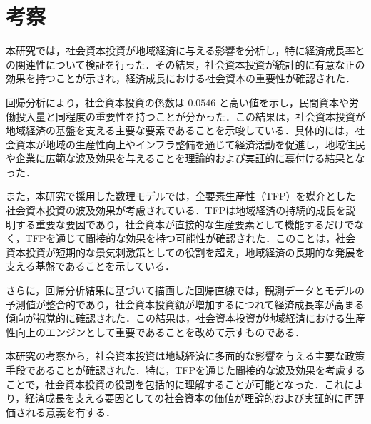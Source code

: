 \section{考察}

本研究では，社会資本投資が地域経済に与える影響を分析し，特に経済成長率との関連性について検証を行った．その結果，社会資本投資が統計的に有意な正の効果を持つことが示され，経済成長における社会資本の重要性が確認された．

回帰分析により，社会資本投資の係数は \( 0.0546 \) と高い値を示し，民間資本や労働投入量と同程度の重要性を持つことが分かった．この結果は，社会資本投資が地域経済の基盤を支える主要な要素であることを示唆している．具体的には，社会資本が地域の生産性向上やインフラ整備を通じて経済活動を促進し，地域住民や企業に広範な波及効果を与えることを理論的および実証的に裏付ける結果となった．

また，本研究で採用した数理モデルでは，全要素生産性（TFP）を媒介とした社会資本投資の波及効果が考慮されている．TFPは地域経済の持続的成長を説明する重要な要因であり，社会資本が直接的な生産要素として機能するだけでなく，TFPを通じて間接的な効果を持つ可能性が確認された．このことは，社会資本投資が短期的な景気刺激策としての役割を超え，地域経済の長期的な発展を支える基盤であることを示している．

さらに，回帰分析結果に基づいて描画した回帰直線では，観測データとモデルの予測値が整合的であり，社会資本投資額が増加するにつれて経済成長率が高まる傾向が視覚的に確認された．この結果は，社会資本投資が地域経済における生産性向上のエンジンとして重要であることを改めて示すものである．

本研究の考察から，社会資本投資は地域経済に多面的な影響を与える主要な政策手段であることが確認された．特に，TFPを通じた間接的な波及効果を考慮することで，社会資本投資の役割を包括的に理解することが可能となった．これにより，経済成長を支える要因としての社会資本の価値が理論的および実証的に再評価される意義を有する．



